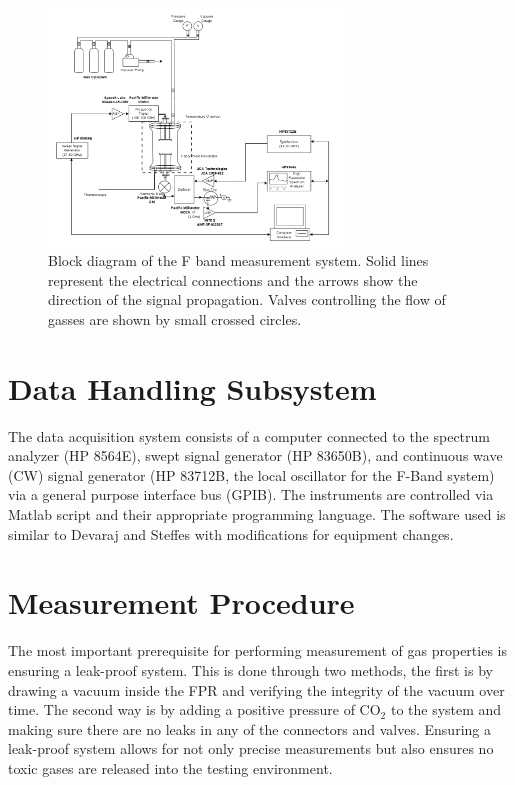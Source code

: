 \begin{figure}[H]
    \centering
	\includegraphics[width=0.7\textwidth]{./images/f-bandsystem.png}
	\caption{Block diagram of the F band measurement system. Solid lines represent the electrical connections and the arrows show the direction of the signal propagation. Valves controlling the flow of gasses are shown by small crossed circles.  }
    \label{fig:fbandimage}
\end{figure}

\section{Data Handling Subsystem}

The data acquisition system consists of a computer connected to the spectrum analyzer (HP 8564E), swept signal generator (HP 83650B), and continuous wave (CW) signal generator (HP 83712B, the local oscillator for the F-Band system) via a general purpose interface bus (GPIB). The instruments are controlled via Matlab script and their appropriate programming language. The software used is similar to Devaraj and Steffes \cite{Devaraj-2011} \cite{Devaraj-thesis} with modifications for equipment changes.

\section{Measurement Procedure}

The most important prerequisite for performing measurement of gas properties is ensuring a leak-proof system. This is done through two methods, the first is by drawing a vacuum inside the FPR and verifying the integrity of the vacuum over time. The second way is by adding a positive pressure of CO$_2$ to the system and making sure there are no leaks in any of the connectors and valves. Ensuring a leak-proof system allows for not only precise measurements but also ensures no toxic gases are released into the testing environment.

